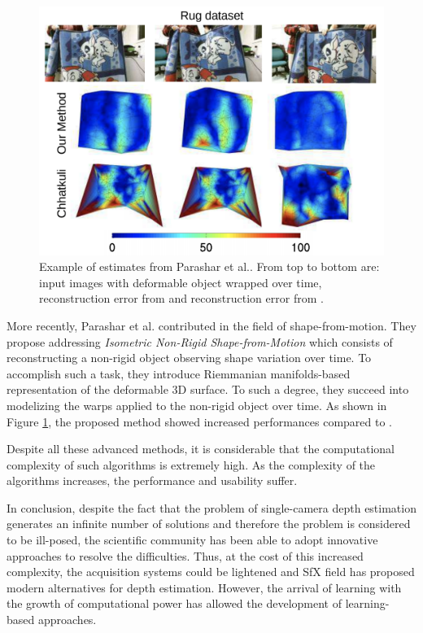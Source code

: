 \begin{figure}[h]
	\centering
	\includegraphics[width=0.8\linewidth]{Figures/SOA/parshar}
	\caption[Example of estimates from Parashar et al.]{Example of estimates from Parashar et al.\cite{parashar2016isometric}. From top to bottom are: input images with deformable object wrapped over time, reconstruction error from \cite{parashar2016isometric} and reconstruction error from \cite{chhatkuli2014non}.}
	\label{illuparshar}
\end{figure}


More recently, Parashar et al. \cite{parashar2016isometric} contributed in the field of shape-from-motion. They propose addressing \emph{Isometric Non-Rigid Shape-from-Motion} which consists of reconstructing a non-rigid object observing shape variation over time. To accomplish such a task, they introduce Riemmanian manifolds-based\cite{lee2006riemannian} representation of the deformable 3D surface. To such a degree, they succeed into modelizing the warps applied to the non-rigid object over time. As shown in Figure \ref{illuparshar}, the proposed method showed increased performances compared to \cite{chhatkuli2014non}.


Despite all these advanced methods, it is considerable that the computational complexity of such algorithms is extremely high. As the complexity of the algorithms increases, the performance and usability suffer.



In conclusion, despite the fact that the problem of single-camera depth estimation generates an infinite number of solutions and therefore the problem is considered to be ill-posed, the scientific community has been able to adopt innovative approaches to resolve the difficulties. Thus, at the cost of this increased complexity, the acquisition systems could be lightened and SfX field has proposed modern alternatives for depth estimation.
However, the arrival of learning with the growth of computational power has allowed the development of learning-based approaches. 

